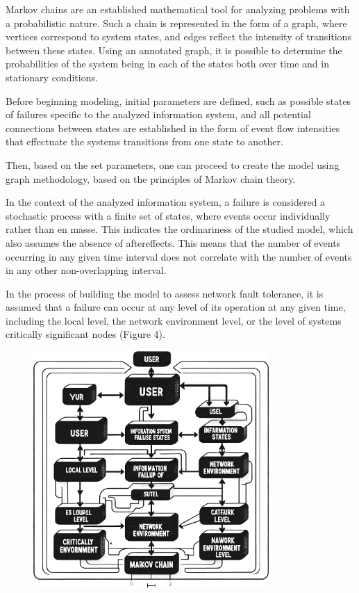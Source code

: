 Markov chains are an established mathematical tool for analyzing
problems with a probabilistic nature. Such a chain is represented in the
form of a graph, where vertices correspond to system states, and edges
reflect the intensity of transitions between these states. Using an
annotated graph, it is possible to determine the probabilities of the
system being in each of the states both over time and in stationary
conditions.

Before beginning modeling, initial parameters are defined, such as
possible states of failures specific to the analyzed information system,
and all potential connections between states are established in the form
of event flow intensities that effectuate the system\textquotesingle s
transitions from one state to another.

Then, based on the set parameters, one can proceed to create the model
using graph methodology, based on the principles of Markov chain theory.

In the context of the analyzed information system, a failure is
considered a stochastic process with a finite set of states, where
events occur individually rather than en masse. This indicates the
ordinariness of the studied model, which also assumes the absence of
aftereffects. This means that the number of events occurring in any
given time interval does not correlate with the number of events in any
other non-overlapping interval.

In the process of building the model to assess network fault tolerance,
it is assumed that a failure can occur at any level of its operation at
any given time, including the local level, the network environment
level, or the level of system\textquotesingle s critically significant
nodes (Figure 4).

\begin{figure}[H]
	\centering
	\includegraphics[width=0.8\textwidth]{assets/46}
	\caption*{}
\end{figure}

